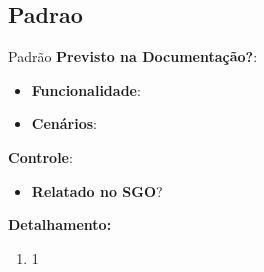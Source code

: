 \subsection{Padrao}
\begin{falha}[0]{Padrão}
	\textbf{Previsto na Documentação?}: \mscheckint
	\begin{itemize}
		\item \textbf{Funcionalidade}:
		\item \textbf{Cenários}:
	\end{itemize}
	
	\textbf{Controle}:
	\begin{itemize}
		\item \textbf{Relatado no SGO}? \mschecknao %
	\end{itemize}
	
	\tcblower
	
	\textbf{Detalhamento:}
	\begin{enumerate}
		\item 1
	\end{enumerate}
	
\end{falha}
